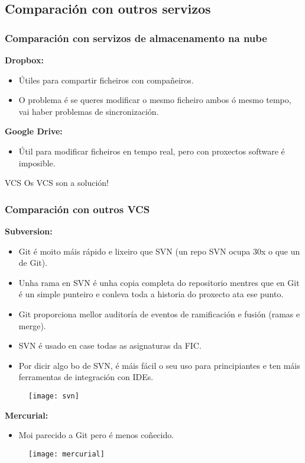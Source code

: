 \subsection{Comparación con outros servizos}
\begin{frame}
  \scriptsize
  \frametitle{Comparación con servizos de almacenamento na nube}
  \begin{multicols}{2}
    \textbf{Dropbox:}
    \begin{itemize}
    \item Útiles para compartir ficheiros con compañeiros.
    \item O problema é se queres modificar o mesmo ficheiro ambos ó mesmo tempo, vai haber problemas de sincronización.
    \end{itemize}
    \columnbreak
    \textbf{Google Drive:}
    \begin{itemize}
    \item Útil para modificar ficheiros en tempo real, pero con proxectos software é imposible.
    \end{itemize}
  \end{multicols}
  \begin{alertblock}{VCS}
    Os VCS son a solución!
  \end{alertblock}
\end{frame}

\begin{frame}
  \frametitle{Comparación con outros VCS}
  \tiny
  \begin{multicols}{2}
    \textbf{Subversion:}
    \begin{itemize}
    \item Git é moito máis rápido e lixeiro que SVN (un repo SVN ocupa 30x o que un de Git).
    \item Unha rama en SVN é unha copia completa do repositorio mentres que en Git é un simple punteiro e conleva toda a historia do proxecto ata ese punto.
    \item Git proporciona mellor auditoría de eventos de ramificación e fusión (ramas e merge).
    \item SVN é usado en case todas as asignaturas da FIC.
    \item Por dicir algo bo de SVN, é máis fácil o seu uso para principiantes e ten máis ferramentas de integración con IDEs.
    \end{itemize}
    \begin{figure}
      \centering
      \texttt{[image: svn]}
      \label{fig:svn}
    \end{figure}

    \columnbreak

    \textbf{Mercurial:}
    \begin{itemize}
    \item Moi parecido a Git pero é menos coñecido.
    \end{itemize}
    \begin{figure}
      \centering
      \texttt{[image: mercurial]}
      \label{fig:mercurial}
    \end{figure}
  \end{multicols}
\end{frame}

